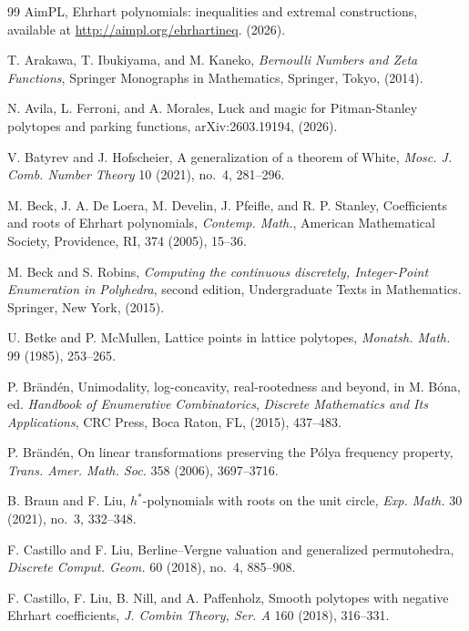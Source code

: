 \documentclass[reqno, 12pt]{article}
\numberwithin{equation}{section}
\theoremstyle{definition}
\begin{document}
\begin{thebibliography}{99}
 AimPL, Ehrhart polynomials: inequalities and extremal constructions, available at \url{http://aimpl.org/ehrhartineq}. (2026).

 T. Arakawa, T. Ibukiyama, and M. Kaneko, \emph{Bernoulli Numbers and Zeta Functions}, Springer Monographs in Mathematics, Springer, Tokyo, (2014).

 N. Avila, L. Ferroni, and A. Morales, Luck and magic for Pitman-Stanley polytopes and parking functions, arXiv:2603.19194, (2026).

 V. Batyrev and J. Hofscheier, A generalization of a theorem of White, \emph{Mosc. J. Comb. Number Theory} 10 (2021), no.~4, 281--296.

 M. Beck, J. A. De Loera, M. Develin, J. Pfeifle, and R. P. Stanley, Coefficients and roots of Ehrhart polynomials, \emph{Contemp. Math.}, American Mathematical Society, Providence, RI, 374 (2005), 15--36.

 M. Beck and S. Robins, \emph{Computing the continuous discretely, Integer-Point Enumeration in Polyhedra}, second edition, Undergraduate Texts in Mathematics. Springer, New York, (2015).

 U. Betke and P. McMullen, Lattice points in lattice polytopes, \emph{Monatsh. Math.} 99 (1985), 253--265.

 P. Br\"and\'en, Unimodality, log-concavity, real-rootedness and beyond, in M. B\'ona, ed. \emph{Handbook of Enumerative Combinatorics}, \emph{Discrete Mathematics and Its Applications}, CRC Press, Boca Raton, FL, (2015), 437--483.

 P. Br\"and\'en, On linear transformations preserving the P\'olya frequency property, \emph{Trans. Amer. Math. Soc.} 358 (2006), 3697--3716.

 B. Braun and F. Liu, $h^*$-polynomials with roots on the unit circle, \emph{Exp. Math.} 30 (2021), no.~3, 332--348.

 F. Castillo and F. Liu, Berline--Vergne valuation and generalized permutohedra, \emph{Discrete Comput. Geom.} 60 (2018), no.~4, 885--908.

 F. Castillo, F. Liu, B. Nill, and A. Paffenholz, Smooth polytopes with negative Ehrhart coefficients, \emph{J. Combin Theory, Ser. A} 160 (2018), 316--331.



\end{thebibliography}
\end{document}
